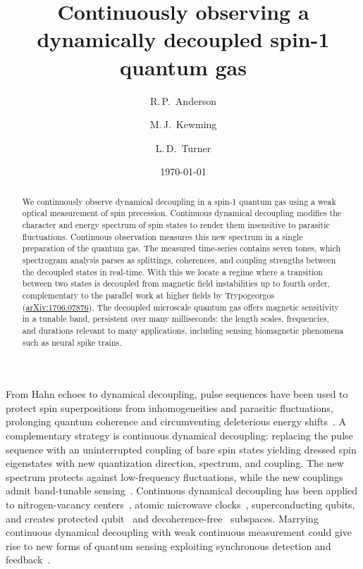 \documentclass[aps,prl,reprint,superscriptaddress,floatfix]{revtex4-1}
\begin{document}
\title{Continuously observing a dynamically decoupled spin-1 quantum gas}

\author{R.\,P.~Anderson}
\author{M.\,J.~Kewming}
\author{L.\,D.~Turner}

\date{\today}

\begin{abstract}
We continuously observe dynamical decoupling in a spin-1 quantum gas using a weak optical measurement of spin precession.
Continuous dynamical decoupling modifies the character and energy spectrum of spin states to render them insensitive to parasitic fluctuations. 
Continuous observation measures this new spectrum in a single preparation of the quantum gas.
The measured time-series contains seven tones, which spectrogram analysis parses as splittings, coherences, and coupling strengths between the decoupled states in real-time.
With this we locate a regime where a transition between two states is decoupled from magnetic field instabilities up to fourth order, complementary to the parallel work at higher fields by Trypogeorgos \etal (\href{https://arxiv.org/abs/1706.07876}{arXiv:1706.07876}).
The decoupled microscale quantum gas offers magnetic sensitivity in a tunable band, persistent over many milliseconds: the length scales, frequencies, and durations relevant to many applications, including sensing biomagnetic phenomena such as neural spike trains.
\end{abstract}

\maketitle

From Hahn echoes to dynamical decoupling, pulse sequences have been used to protect spin superpositions from inhomogeneities and parasitic fluctuations, prolonging quantum coherence and circumventing deleterious energy shifts~\cite{biercuk_optimized_2009,lange_universal_2010,bluhm_dephasing_2011}.
A complementary strategy is continuous dynamical decoupling: replacing the pulse sequence with an uninterrupted coupling of bare spin states yielding dressed spin eigenstates with new quantization direction, spectrum, and coupling.
The new spectrum protects against low-frequency fluctuations, while the new couplings admit band-tunable sensing~\cite{fanchini_continuously_2007}.
Continuous dynamical decoupling has been applied to nitrogen-vacancy centers~\cite{hirose_continuous_2012,loretz_radio-frequency_2013,cai_robust_2012,*cai_long-lived_2012,golter_protecting_2014}, atomic microwave clocks~\cite{kazakov_magic_2015,sarkany_controlling_2014}, superconducting qubits, and creates protected qubit~\cite{aharon_general_2013,baumgart_ultrasensitive_2016} and decoherence-free~\cite{facchi_quantum_2002,*facchi_unification_2004} subspaces.
Marrying continuous dynamical decoupling with weak continuous measurement could give rise to new forms of quantum sensing exploiting synchronous detection and feedback~\cite{vijay_stabilizing_2012}.
\end{document}
